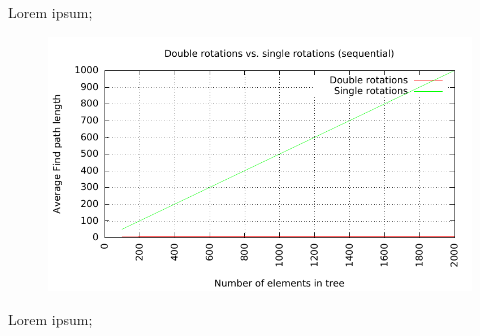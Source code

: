 \documentclass[12pt,a4paper]{report}
\begin{document}
Lorem ipsum;

	\begin{figure}[h]	
		\centering	
		\includegraphics[scale=0.75]{graph_4}		
	\end{figure}

Lorem ipsum;
\end{document}
